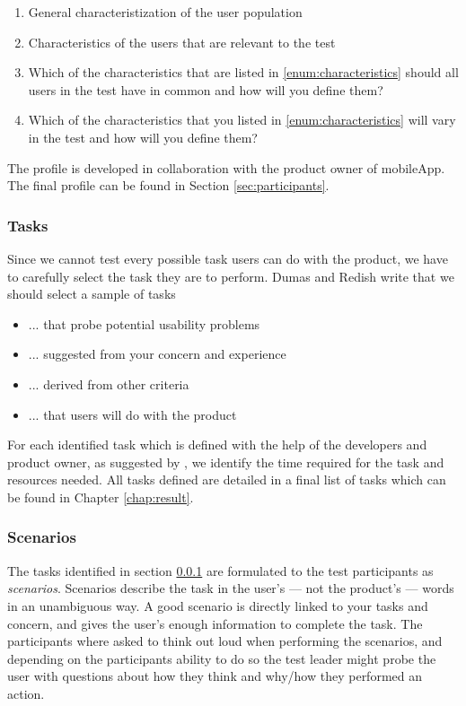 \begin{enumerate}
  \item General characteristization of the user population
  \item \label{enum:characteristics}Characteristics of the users that are relevant to the test
  \item Which of the characteristics that are listed in \ref{enum:characteristics} should all users in the test have in common and how will you define them?
  \item Which of the characteristics that you listed in \ref{enum:characteristics} will vary in the test and how will you define them?
\end{enumerate}

The profile is developed in collaboration with the product owner of mobileApp. The final profile can be found in Section \ref{sec:participants}.

\subsubsection{Tasks}
\label{subsubsec:tasks}

Since we cannot test every possible task users can do with the product, we have to carefully select the task they are to perform. Dumas and Redish \cite{Dumas1999} write that we should select a sample of tasks
\begin{itemize}[noitemsep]
  \item ... that probe potential usability problems
  \item ... suggested from your concern and experience
  \item ... derived from other criteria
  \item ... that users will do with the product
\end{itemize}

For each identified task which is defined with the help of the developers and product owner, as suggested by \cite{Dumas1999}, we identify the time required for the task and resources needed. All tasks defined are detailed in a final list of tasks which can be found in Chapter \ref{chap:result}.

\subsubsection{Scenarios}
The tasks identified in section \ref{subsubsec:tasks} are formulated to the test participants as \textit{scenarios}. Scenarios describe the task in the user's --- not the product's --- words in an unambiguous way. A good scenario is directly linked to your tasks and concern, and gives the user's enough information to complete the task. The participants where asked to think out loud when performing the scenarios, and depending on the participants ability to do so the test leader might probe the user with questions about how they think and why/how they performed an action.

